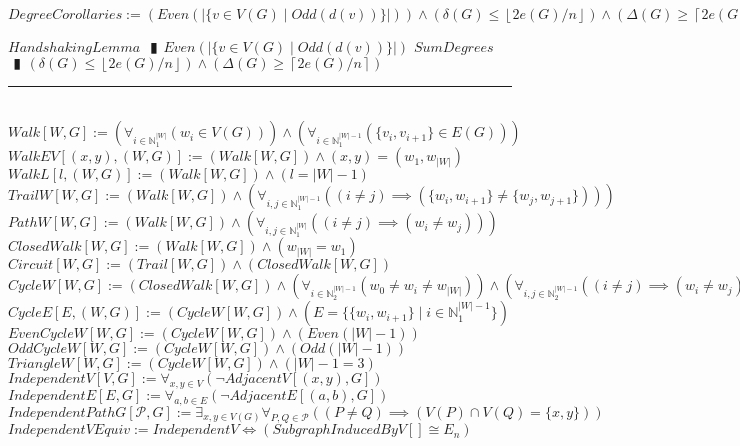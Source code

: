 \documentclass{book}
\newcommand{\abr}{:=}
\newcommand{\pipe}{$\phantom{(}\vrectangleblack\phantom{)}$}
\newcommand{\pr}[1]{\left(#1\right)}
\newcommand{\st}{\mathbin{|}}
\newcommand{\utup}[1]{\{#1\}}
\newcommand{\floor}[1]{\left\lfloor #1 \right\rfloor}
\newcommand{\ceil}[1]{\left\lceil #1 \right\rceil}
\begin{document}
$DegreeCorollaries \abr \pr{Even\pr{|\{v \in V(G) \st Odd\pr{d(v)}\}|}} \land \pr{\delta(G) \leq \floor{2 e(G) / n}} \land \pr{\Delta(G) \geq \ceil{2 e(G) / n}}$
\begin{enumerate}
  \lit $HandshakingLemma$ \pipe $Even\pr{|\{v \in V(G) \st Odd\pr{d(v)}\}|}$
  \lit $SumDegrees$ \pipe $\pr{\delta(G) \leq \floor{2 e(G) / n}} \land \pr{\Delta(G) \geq \ceil{2 e(G) / n}}$
\end{enumerate} \vspace{.75mm} \hrule \vspace{.75mm} \ \\ 

$Walk[W, G] \abr \pr{\forall_{i \in \mathbb{N}_1^{|W|}}\pr{w_i \in V(G)}} \land \pr{\forall_{i \in \mathbb{N}_1^{|W| - 1}}\pr{\utup{v_i, v_{i + 1}} \in E(G)}}$ \\
$WalkEV[(x, y), (W, G)] \abr (Walk[W, G]) \land (x, y) = (w_1, w_{|W|})$ \\
$WalkL[l, (W, G)] \abr (Walk[W, G]) \land (l = |W| - 1)$ \\
$TrailW[W, G] \abr (Walk[W, G]) \land \pr{\forall_{i, j \in \mathbb{N}_1^{|W| - 1}}\pr{(i \neq j) \implies (\utup{w_i, w_{i + 1}} \neq \utup{w_j, w_{j + 1}})}}$ \\
$PathW[W, G] \abr (Walk[W, G]) \land \pr{\forall_{i, j \in \mathbb{N}_1^{|W|}}\pr{(i \neq j) \implies (w_i \neq w_j)}}$ \\

$ClosedWalk[W, G] \abr (Walk[W, G]) \land (w_{|W|} = w_1)$ \\
$Circuit[W, G] \abr (Trail[W, G]) \land (ClosedWalk[W, G])$ \\
$CycleW[W, G] \abr (ClosedWalk[W, G]) \land \pr{\forall_{i \in \mathbb{N}_2^{|W| - 1}}(w_0 \neq w_i \neq w_{|W|})} \land \pr{\forall_{i, j \in \mathbb{N}_2^{|W| - 1}}\pr{(i \neq j) \implies (w_i \neq w_j)}} \land (|W| - 1 \geq 3)$ \\
$CycleE[E, (W, G)] \abr (CycleW[W, G]) \land (E = \{\utup{w_i, w_{i + 1}} \st i \in \mathbb{N}_1^{|W| - 1}\})$ \\
$EvenCycleW[W, G] \abr (CycleW[W, G]) \land \pr{Even(|W| - 1)}$ \\
$OddCycleW[W, G] \abr (CycleW[W, G]) \land \pr{Odd(|W| - 1)}$ \\
$TriangleW[W, G] \abr (CycleW[W, G]) \land (|W| - 1 = 3)$ \\

$IndependentV[V, G] \abr \forall_{x, y \in V}\pr{\lnot AdjacentV[(x, y), G]}$ \\
$IndependentE[E, G] \abr \forall_{a, b \in E}\pr{\lnot AdjacentE[(a, b), G]}$ \\
$IndependentPathG[\mathcal{P}, G] \abr \exists_{x, y \in V(G)} \forall_{P, Q \in \mathcal{P}}\pr{(P \neq Q) \implies \pr{V(P) \cap V(Q) = \utup{x, y}}}$ \\
$IndependentVEquiv \abr IndependentV \iff (SubgraphInducedByV[] \cong E_n)$ \\
\end{document}
